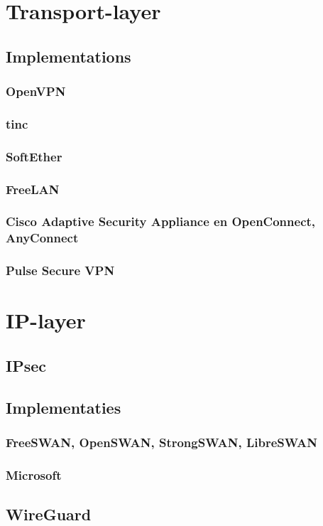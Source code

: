 \documentclass[a4paper,12pt,twoside,openright,titlepage]{book}
\begin{document}
\chapter{Transport-layer}
\section{Implementations}
\subsection{OpenVPN}
\subsection{tinc}
\subsection{SoftEther}
\subsection{FreeLAN}
\subsection{Cisco Adaptive Security Appliance en OpenConnect, AnyConnect}
\subsection{Pulse Secure VPN}

\chapter{IP-layer}
\section{IPsec}

\section{Implementaties}
\subsection{FreeSWAN, OpenSWAN, StrongSWAN, LibreSWAN}
\subsection{Microsoft}
\section{WireGuard}


\printindex
\end{document}
